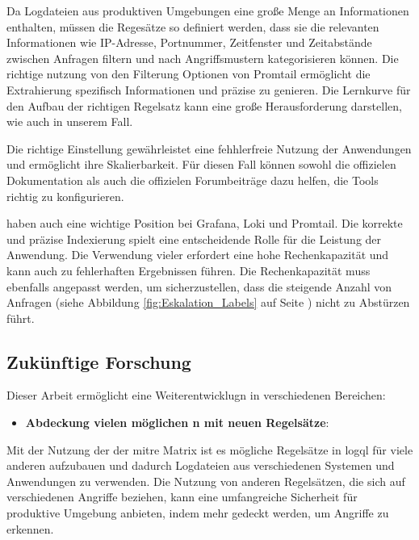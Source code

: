 Da Logdateien aus produktiven Umgebungen eine große Menge an Informationen enthalten, müssen die Regesätze so definiert werden, dass sie die relevanten Informationen wie IP-Adresse, Portnummer, Zeitfenster und Zeitabstände zwischen Anfragen filtern und nach Angriffsmustern kategorisieren können. Die richtige nutzung von den Filterung Optionen von Promtail  ermöglicht die Extrahierung spezifisch Informationen und präzise  zu genieren. Die Lernkurve für den Aufbau der richtigen Regelsatz kann eine große Herausforderung darstellen, wie auch in unserem Fall.

Die richtige Einstellung gewährleistet eine fehhlerfreie Nutzung der Anwendungen und ermöglicht ihre Skalierbarkeit. Für diesen Fall können sowohl die offizielen Dokumentation als auch die offizielen Forumbeiträge dazu helfen, die Tools richtig zu konfigurieren.

 haben auch eine wichtige Position bei Grafana, Loki und Promtail. Die korrekte und präzise Indexierung spielt eine entscheidende Rolle für die Leistung der Anwendung. Die Verwendung vieler   erfordert eine hohe Rechenkapazität und kann auch zu fehlerhaften Ergebnissen führen. Die Rechenkapazität muss ebenfalls angepasst werden, um sicherzustellen, dass die steigende Anzahl von Anfragen (siehe Abbildung \ref{fig:Eskalation_Labels} auf Seite \pageref{fig:Eskalation_Labels}) nicht zu Abstürzen führt.

\subsection{Zukünftige Forschung}
Dieser Arbeit ermöglicht eine Weiterentwicklugn in verschiedenen Bereichen:
 
\begin{itemize}[noitemsep]
    \item \textbf{Abdeckung vielen möglichen n mit neuen Regelsätze}:
\end{itemize}

Mit der Nutzung der  der \gls{mitre} Matrix ist es mögliche Regelsätze in \gls{logql} für viele anderen  aufzubauen und dadurch Logdateien aus verschiedenen Systemen und Anwendungen zu verwenden. Die Nutzung von anderen Regelsätzen, die sich auf verschiedenen Angriffe beziehen, kann eine umfangreiche Sicherheit für produktive Umgebung anbieten, indem mehr  gedeckt werden, um Angriffe zu erkennen.



